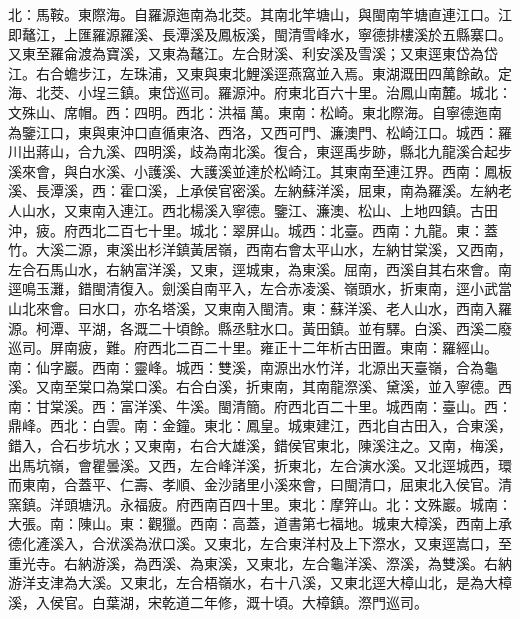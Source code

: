 \begin{pinyinscope}
北：馬鞍。東際海。自羅源迤南為北茭。其南北竿塘山，與閩南竿塘直連江口。江即鼇江，上匯羅源羅溪、長潭溪及鳳板溪，閩清雪峰水，寧德排樓溪於五縣寨口。又東至羅侖渡為寶溪，又東為鼇江。左合財溪、利安溪及雪溪；又東逕東岱為岱江。右合蟾步江，左珠浦，又東與東北鯉溪逕燕窩並入焉。東湖溉田四萬餘畝。定海、北茭、小埕三鎮。東岱巡司。羅源沖。府東北百六十里。治鳳山南麓。城北：文殊山、席帽。西：四明。西北：洪福萬。東南：松崎。東北際海。自寧德迤南為鑒江口，東與東沖口直循東洛、西洛，又西可門、濂澳門、松崎江口。城西：羅川出蔣山，合九溪、四明溪，歧為南北溪。復合，東逕禹步跡，縣北九龍溪合起步溪來會，與白水溪、小護溪、大護溪並達於松崎江。其東南至連江界。西南：鳳板溪、長潭溪，西：霍口溪，上承侯官密溪。左納蘇洋溪，屈東，南為羅溪。左納老人山水，又東南入連江。西北楊溪入寧德。鑒江、濂澳、松山、上地四鎮。古田沖，疲。府西北二百七十里。城北：翠屏山。城西：北臺。西南：九龍。東：蓋竹。大溪二源，東溪出杉洋鎮黃居嶺，西南右會太平山水，左納甘棠溪，又西南，左合石馬山水，右納富洋溪，又東，逕城東，為東溪。屈南，西溪自其右來會。南逕鳴玉灘，錯閩清復入。劍溪自南平入，左合赤凌溪、嶺頭水，折東南，逕小武當山北來會。曰水口，亦名塔溪，又東南入閩清。東：蘇洋溪、老人山水，西南入羅源。柯潭、平湖，各溉二十頃餘。縣丞駐水口。黃田鎮。並有驛。白溪、西溪二廢巡司。屏南疲，難。府西北二百二十里。雍正十二年析古田置。東南：羅經山。南：仙字巖。西南：靈峰。城西：雙溪，南源出水竹洋，北源出天臺嶺，合為龜溪。又南至棠口為棠口溪。右合白溪，折東南，其南龍漈溪、黛溪，並入寧德。西南：甘棠溪。西：富洋溪、牛溪。閩清簡。府西北百二十里。城西南：臺山。西：鼎峰。西北：白雲。南：金鐘。東北：鳳皇。城東建江，西北自古田入，合東溪，錯入，合石步坑水；又東南，右合大雄溪，錯侯官東北，陳溪注之。又南，梅溪，出馬坑嶺，會瞿曇溪。又西，左合峰洋溪，折東北，左合演水溪。又北逕城西，環而東南，合蓋平、仁壽、孝順、金沙諸里小溪來會，曰閩清口，屈東北入侯官。清窯鎮。洋頭塘汛。永福疲。府西南百四十里。東北：摩笄山。北：文殊巖。城南：大張。南：陳山。東：觀獵。西南：高蓋，道書第七福地。城東大樟溪，西南上承德化滻溪入，合洑溪為洑口溪。又東北，左合東洋村及上下漈水，又東逕嵩口，至重光寺。右納游溪，為西溪、為東溪，又東北，左合龜洋溪、漈溪，為雙溪。右納游洋支津為大溪。又東北，左合梧嶺水，右十八溪，又東北逕大樟山北，是為大樟溪，入侯官。白葉湖，宋乾道二年修，溉十頃。大樟鎮。漈門巡司。


\end{pinyinscope}
